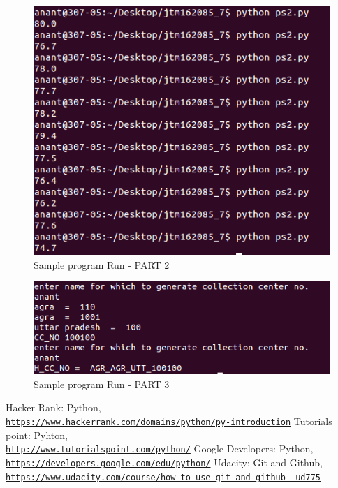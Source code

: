 \documentclass[11pt]{article}
\begin{document}
\begin{figure}[h]
\includegraphics[scale=0.6]{p21}
\centering
\caption{Sample program Run - PART 2}
\end{figure}
\begin{figure}[h]
\includegraphics[scale=0.7]{p3}
\centering
\caption{Sample program Run - PART 3}
\end{figure}
\newpage
\newpage
\begin{center}
\begin{thebibliography}{9}
 
Hacker Rank: Python,
\\\texttt{\url {https://www.hackerrank.com/domains/python/py-introduction}}
\bibitem{} 
Tutorials point: Pyhton,
\\\texttt{\url {http://www.tutorialspoint.com/python/}}
\bibitem{} 
Google Developers: Python,
\\\texttt{\url {https://developers.google.com/edu/python/}}
\bibitem{} 
Udacity: Git and Github,
\\\texttt{\url {https://www.udacity.com/course/how-to-use-git-and-github--ud775}}
\end{thebibliography}
\end{center}
\end{document}
